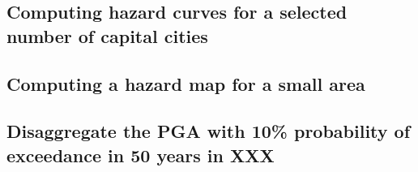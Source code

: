 %
\subsection{Computing hazard curves for a selected number of capital cities}


\subsection{Computing a hazard map for a small area}
\subsection{Disaggregate the PGA with 10\% probability of exceedance in 50 
        years in XXX}
